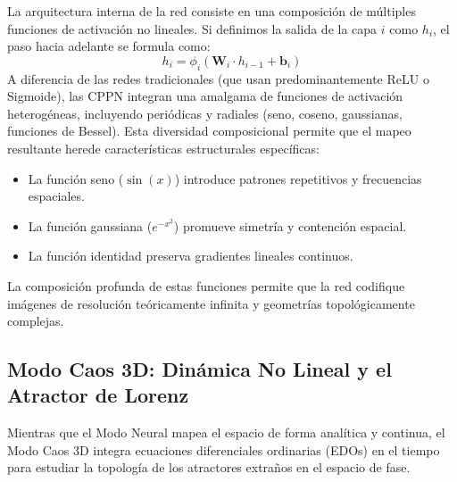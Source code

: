 \documentclass[12pt, openany]{book}
\begin{document}
La arquitectura interna de la red consiste en una composición de múltiples funciones de activación no lineales. Si definimos la salida de la capa $i$ como $h_i$, el paso hacia adelante se formula como:
\begin{equation}
    h_i = \phi_i ( \mathbf{W}_i \cdot h_{i-1} + \mathbf{b}_i )
\end{equation}
A diferencia de las redes tradicionales (que usan predominantemente ReLU o Sigmoide), las CPPN integran una amalgama de funciones de activación heterogéneas, incluyendo periódicas y radiales (seno, coseno, gaussianas, funciones de Bessel). Esta diversidad composicional permite que el mapeo resultante herede características estructurales específicas:
\begin{itemize}
    \item La función seno ($\sin(x)$) introduce patrones repetitivos y frecuencias espaciales.
    \item La función gaussiana ($e^{-x^2}$) promueve simetría y contención espacial.
    \item La función identidad preserva gradientes lineales continuos.
\end{itemize}
La composición profunda de estas funciones permite que la red codifique imágenes de resolución teóricamente infinita y geometrías topológicamente complejas.

\subsection{Modo Caos 3D: Dinámica No Lineal y el Atractor de Lorenz}

Mientras que el Modo Neural mapea el espacio de forma analítica y continua, el Modo Caos 3D integra ecuaciones diferenciales ordinarias (EDOs) en el tiempo para estudiar la topología de los atractores extraños en el espacio de fase. 
\end{document}
